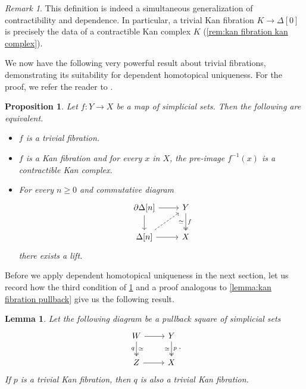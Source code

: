 \documentclass[11pt, a4paper]{amsart}
\newtheorem{lemma}[equation]{Lemma}
\newtheorem{proposition}[equation]{Proposition}
\theoremstyle{definition}
\theoremstyle{remark}
\newtheorem{remark}[equation]{Remark}
\numberwithin{equation}{section}
\begin{document}
\begin{remark} \label{rem:trivial fibration over point}
  This definition is indeed a simultaneous generalization of contractibility and dependence. In particular, a trivial Kan fibration $K \to \Delta[0]$ is precisely the data of a contractible Kan complex $K$ (\cref{rem:kan fibration kan complex}).
\end{remark}

We now have the following very powerful result about trivial fibrations, demonstrating its suitability for dependent homotopical uniqueness. For the proof, we refer the reader to \cite[Theorem 7.10]{goerssjardine2009simplicialhomotopytheory}.

\begin{proposition} \label{prop:trivial fib}
  Let $f\colon Y \to X$ be a map of simplicial sets. Then the following are equivalent.
  \begin{itemize}[leftmargin=*]
    \item $f$ is a trivial fibration.
    \item $f$ is a Kan fibration and for every $x$ in $X$, the pre-image $f^{-1}(x)$ is a contractible Kan complex.
    \item For every $n \geq 0$ and commutative diagram
    \[  
    \begin{tikzcd}
     \partial \Delta[n] \arrow[r] \arrow[d] & Y \arrow[d, "f", twoheadrightarrow, "\simeq"'] \\
     \Delta[n] \arrow[r] \arrow[ur, dashed] & X
    \end{tikzcd}
    \]
   there exists a lift.
  \end{itemize}
\end{proposition}

Before we apply dependent homotopical uniqueness in the next section, let us record how the third condition of \cref{prop:trivial fib} and a proof analogous to \cref{lemma:kan fibration pullback} give us the following result.

\begin{lemma} \label{lemma:trivial fibration pullback}
  Let the following diagram be a pullback square of simplicial sets
  \[
  \begin{tikzcd}
    W \arrow[r] \arrow[d, "q"', twoheadrightarrow, "\simeq"] & Y \arrow[d, "p", twoheadrightarrow, "\simeq"'] \\
    Z \arrow[r] & X
  \end{tikzcd}.
  \]
  If $p$ is a trivial Kan fibration, then $q$ is also a trivial Kan fibration.
\end{lemma}
\end{document}
